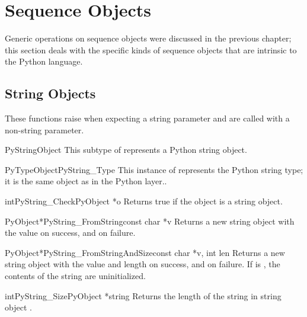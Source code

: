 \documentclass{manual}
\begin{document}
\section{Sequence Objects \label{sequenceObjects}}

Generic operations on sequence objects were discussed in the previous 
chapter; this section deals with the specific kinds of sequence 
objects that are intrinsic to the Python language.


\subsection{String Objects \label{stringObjects}}

These functions raise  when expecting a string
parameter and are called with a non-string parameter.

\begin{ctypedesc}{PyStringObject}
This subtype of  represents a Python string object.
\end{ctypedesc}

\begin{cvardesc}{PyTypeObject}{PyString_Type}
This instance of  represents the Python string
type; it is the same object as  in the Python
layer..
\end{cvardesc}

\begin{cfuncdesc}{int}{PyString_Check}{PyObject *o}
Returns true if the object  is a string object.
\end{cfuncdesc}

\begin{cfuncdesc}{PyObject*}{PyString_FromString}{const char *v}
Returns a new string object with the value  on success, and
\NULL{} on failure.
\end{cfuncdesc}

\begin{cfuncdesc}{PyObject*}{PyString_FromStringAndSize}{const char *v,
                                                         int len}
Returns a new string object with the value  and length
 on success, and \NULL{} on failure.  If  is \NULL{},
the contents of the string are uninitialized.
\end{cfuncdesc}

\begin{cfuncdesc}{int}{PyString_Size}{PyObject *string}
Returns the length of the string in string object .
\end{cfuncdesc}
\end{document}
